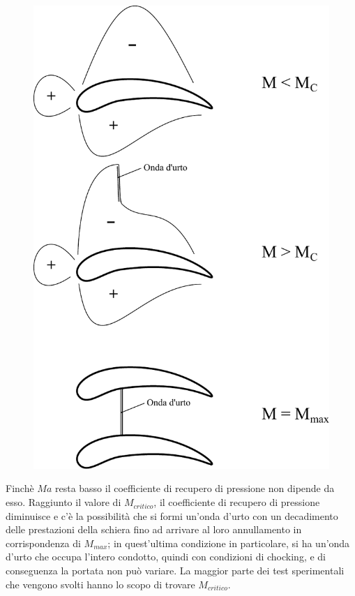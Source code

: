 \begin{figure}[h!]
\begin{minipage}{.4\textwidth}
  \includegraphics[width=.95\linewidth]{fig/FuoriProgMach.pdf}
  \label{fig:FuoriProgMach}
\end{minipage}
\end{figure}
Finchè $Ma$ resta basso il coefficiente di recupero di pressione non dipende da esso. Raggiunto il valore di $M_{critico}$, il coefficiente di recupero di pressione diminuisce e c'è la possibilità che si formi un'onda d'urto con un decadimento delle prestazioni della schiera fino ad arrivare al loro annullamento in corrispondenza di $M_{max}$; in quest'ultima condizione in particolare, si ha un'onda d'urto che occupa l'intero condotto, quindi con condizioni di chocking, e di conseguenza la portata non può variare. La maggior parte dei test sperimentali che vengono svolti hanno lo scopo di trovare $M_{critico}$.
